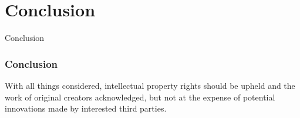 \documentclass{beamer}
\begin{document}
\section{Conclusion}
\begin{frame}{Conclusion}
\frametitle{Conclusion}
	With all things considered, intellectual property rights should be upheld and the work of original
	creators acknowledged, but not at the expense of potential innovations made by interested third parties.
\end{frame}

\end{document}
